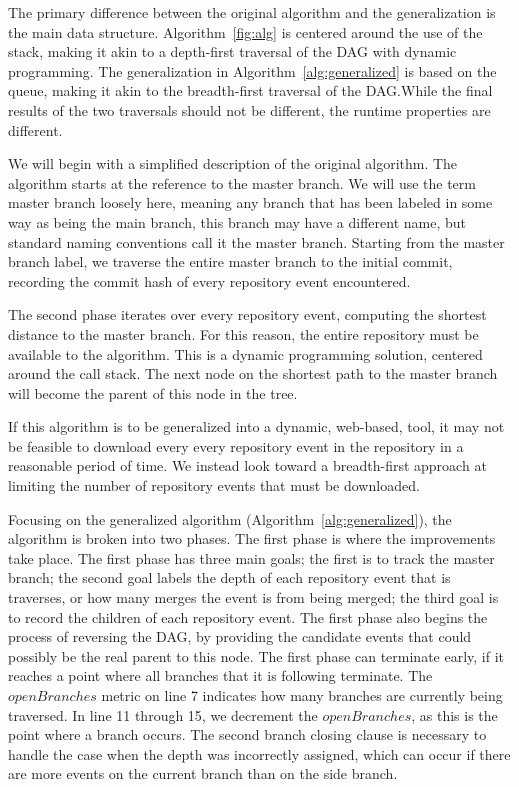 The primary difference between the original algorithm and the
generalization is the main data structure. Algorithm~\ref{fig:alg}
is centered around the use of the stack, making it akin to a depth-first
traversal of the DAG with dynamic programming. The generalization in
Algorithm~\ref{alg:generalized} is based on the queue, making it akin to
the breadth-first traversal of the DAG.\@ While the final results of the
two traversals should not be different, the runtime properties are
different.

We will begin with a simplified description of the original algorithm.
The algorithm starts at the reference to the master branch. We will use
the term master branch loosely here, meaning any branch that has been
labeled in some way as being the main branch, this branch may have a
different name, but standard naming conventions call it the master
branch. Starting from the master branch label, we traverse the entire
master branch to the initial commit, recording the commit hash of every
repository event encountered.

The second phase iterates over every repository event, computing the
shortest distance to the master branch. For this reason, the entire
repository must be available to the algorithm. This is a dynamic
programming solution, centered around the call stack. The next node on
the shortest path to the master branch will become the parent of this
node in the tree.

If this algorithm is to be generalized into a dynamic, web-based, tool,
it may not be feasible to download every every repository event in the
repository in a reasonable period of time. We instead look toward a
breadth-first approach at limiting the number of repository events that
must be downloaded.

Focusing on the generalized algorithm (Algorithm~\ref{alg:generalized}),
the algorithm is broken into two phases. The first phase is where the
improvements take place. The first phase has three main goals; the first
is to track the master branch; the second goal labels the depth of each
repository event that is traverses, or how many merges the event is from
being merged; the third goal is to record the children of each
repository event. The first phase also begins the process of reversing
the DAG, by providing the candidate events that could possibly be the
real parent to this node. The first phase can terminate early, if it
reaches a point where all branches that it is following terminate. The
$openBranches$ metric on line 7 indicates how many branches are
currently being traversed. In line 11 through 15, we decrement the
$openBranches$, as this is the point where a branch occurs. The second
branch closing clause is necessary to handle the case when the depth was
incorrectly assigned, which can occur if there are more events on the
current branch than on the side branch.

